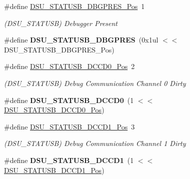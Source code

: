\begin{DoxyCompactItemize}
\item 
\hypertarget{group___s_a_m_l21___d_s_u_ga36bd47009661963b8c71c9dc4cb62ecb}{}\#define \hyperlink{group___s_a_m_l21___d_s_u_ga36bd47009661963b8c71c9dc4cb62ecb}{D\+S\+U\+\_\+\+S\+T\+A\+T\+U\+S\+B\+\_\+\+D\+B\+G\+P\+R\+E\+S\+\_\+\+Pos}~1\label{group___s_a_m_l21___d_s_u_ga36bd47009661963b8c71c9dc4cb62ecb}

\begin{DoxyCompactList}\small\item\em (D\+S\+U\+\_\+\+S\+T\+A\+T\+U\+S\+B) Debugger Present \end{DoxyCompactList}\item 
\hypertarget{group___s_a_m_l21___d_s_u_ga9eae843ddddb99bef3d7358ccb5e8dc9}{}\#define {\bfseries D\+S\+U\+\_\+\+S\+T\+A\+T\+U\+S\+B\+\_\+\+D\+B\+G\+P\+R\+E\+S}~(0x1ul $<$$<$ D\+S\+U\+\_\+\+S\+T\+A\+T\+U\+S\+B\+\_\+\+D\+B\+G\+P\+R\+E\+S\+\_\+\+Pos)\label{group___s_a_m_l21___d_s_u_ga9eae843ddddb99bef3d7358ccb5e8dc9}

\item 
\hypertarget{group___s_a_m_l21___d_s_u_gadc27fc361eacd9fdd30cad6459bdc7c4}{}\#define \hyperlink{group___s_a_m_l21___d_s_u_gadc27fc361eacd9fdd30cad6459bdc7c4}{D\+S\+U\+\_\+\+S\+T\+A\+T\+U\+S\+B\+\_\+\+D\+C\+C\+D0\+\_\+\+Pos}~2\label{group___s_a_m_l21___d_s_u_gadc27fc361eacd9fdd30cad6459bdc7c4}

\begin{DoxyCompactList}\small\item\em (D\+S\+U\+\_\+\+S\+T\+A\+T\+U\+S\+B) Debug Communication Channel 0 Dirty \end{DoxyCompactList}\item 
\hypertarget{group___s_a_m_l21___d_s_u_gac68c39af9734e2a6e6db0dc67bf12507}{}\#define {\bfseries D\+S\+U\+\_\+\+S\+T\+A\+T\+U\+S\+B\+\_\+\+D\+C\+C\+D0}~(1 $<$$<$ \hyperlink{group___s_a_m_l21___d_s_u_gadc27fc361eacd9fdd30cad6459bdc7c4}{D\+S\+U\+\_\+\+S\+T\+A\+T\+U\+S\+B\+\_\+\+D\+C\+C\+D0\+\_\+\+Pos})\label{group___s_a_m_l21___d_s_u_gac68c39af9734e2a6e6db0dc67bf12507}

\item 
\hypertarget{group___s_a_m_l21___d_s_u_ga43c23fdfaa496f809db2e9b7d0bea8a9}{}\#define \hyperlink{group___s_a_m_l21___d_s_u_ga43c23fdfaa496f809db2e9b7d0bea8a9}{D\+S\+U\+\_\+\+S\+T\+A\+T\+U\+S\+B\+\_\+\+D\+C\+C\+D1\+\_\+\+Pos}~3\label{group___s_a_m_l21___d_s_u_ga43c23fdfaa496f809db2e9b7d0bea8a9}

\begin{DoxyCompactList}\small\item\em (D\+S\+U\+\_\+\+S\+T\+A\+T\+U\+S\+B) Debug Communication Channel 1 Dirty \end{DoxyCompactList}\item 
\hypertarget{group___s_a_m_l21___d_s_u_gad229e036a6ca3ec924ca37250b6ea81c}{}\#define {\bfseries D\+S\+U\+\_\+\+S\+T\+A\+T\+U\+S\+B\+\_\+\+D\+C\+C\+D1}~(1 $<$$<$ \hyperlink{group___s_a_m_l21___d_s_u_ga43c23fdfaa496f809db2e9b7d0bea8a9}{D\+S\+U\+\_\+\+S\+T\+A\+T\+U\+S\+B\+\_\+\+D\+C\+C\+D1\+\_\+\+Pos})\label{group___s_a_m_l21___d_s_u_gad229e036a6ca3ec924ca37250b6ea81c}


\end{DoxyCompactItemize}
